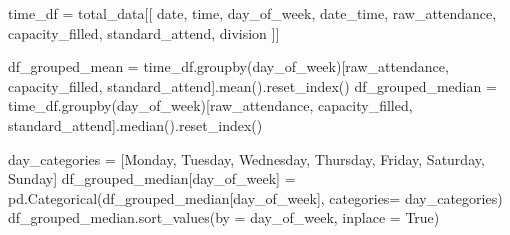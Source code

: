 \documentclass[
  letterpaper,
  DIV=11,
  numbers=noendperiod]{scrartcl}
\newenvironment{Shaded}{\begin{snugshade}}{\end{snugshade}}
\newcommand{\NormalTok}[1]{\textcolor[rgb]{0.00,0.23,0.31}{#1}}
\newcommand{\OperatorTok}[1]{\textcolor[rgb]{0.37,0.37,0.37}{#1}}
\newcommand{\StringTok}[1]{\textcolor[rgb]{0.13,0.47,0.30}{#1}}
\newcommand{\VariableTok}[1]{\textcolor[rgb]{0.07,0.07,0.07}{#1}}
\begin{document}
\begin{Shaded}
\begin{Highlighting}[]
\NormalTok{time\_df }\OperatorTok{=}\NormalTok{ total\_data[[}
    \StringTok{\textquotesingle{}date\textquotesingle{}}\NormalTok{, }\StringTok{\textquotesingle{}time\textquotesingle{}}\NormalTok{, }\StringTok{\textquotesingle{}day\_of\_week\textquotesingle{}}\NormalTok{, }\StringTok{\textquotesingle{}date\_time\textquotesingle{}}\NormalTok{, }\StringTok{\textquotesingle{}raw\_attendance\textquotesingle{}}\NormalTok{, }\StringTok{\textquotesingle{}capacity\_filled\textquotesingle{}}\NormalTok{, }\StringTok{\textquotesingle{}standard\_attend\textquotesingle{}}\NormalTok{, }\StringTok{\textquotesingle{}division\textquotesingle{}}
\NormalTok{]]}


\NormalTok{df\_grouped\_mean }\OperatorTok{=}\NormalTok{ time\_df.groupby(}\StringTok{\textquotesingle{}day\_of\_week\textquotesingle{}}\NormalTok{)[}\StringTok{\textquotesingle{}raw\_attendance\textquotesingle{}}\NormalTok{, }\StringTok{\textquotesingle{}capacity\_filled\textquotesingle{}}\NormalTok{, }\StringTok{\textquotesingle{}standard\_attend\textquotesingle{}}\NormalTok{].mean().reset\_index()}
\NormalTok{df\_grouped\_median }\OperatorTok{=}\NormalTok{ time\_df.groupby(}\StringTok{\textquotesingle{}day\_of\_week\textquotesingle{}}\NormalTok{)[}\StringTok{\textquotesingle{}raw\_attendance\textquotesingle{}}\NormalTok{, }\StringTok{\textquotesingle{}capacity\_filled\textquotesingle{}}\NormalTok{, }\StringTok{\textquotesingle{}standard\_attend\textquotesingle{}}\NormalTok{].median().reset\_index()}

\NormalTok{day\_categories }\OperatorTok{=}\NormalTok{ [}\StringTok{\textquotesingle{}Monday\textquotesingle{}}\NormalTok{, }\StringTok{\textquotesingle{}Tuesday\textquotesingle{}}\NormalTok{, }\StringTok{\textquotesingle{}Wednesday\textquotesingle{}}\NormalTok{, }\StringTok{\textquotesingle{}Thursday\textquotesingle{}}\NormalTok{, }\StringTok{\textquotesingle{}Friday\textquotesingle{}}\NormalTok{, }\StringTok{\textquotesingle{}Saturday\textquotesingle{}}\NormalTok{, }\StringTok{\textquotesingle{}Sunday\textquotesingle{}}\NormalTok{]}
\NormalTok{df\_grouped\_median[}\StringTok{\textquotesingle{}day\_of\_week\textquotesingle{}}\NormalTok{] }\OperatorTok{=}\NormalTok{ pd.Categorical(df\_grouped\_median[}\StringTok{\textquotesingle{}day\_of\_week\textquotesingle{}}\NormalTok{], categories}\OperatorTok{=}\NormalTok{ day\_categories)}
\NormalTok{df\_grouped\_median.sort\_values(by }\OperatorTok{=} \StringTok{\textquotesingle{}day\_of\_week\textquotesingle{}}\NormalTok{, inplace }\OperatorTok{=} \VariableTok{True}\NormalTok{)}
\end{Highlighting}
\end{Shaded}
\end{document}
